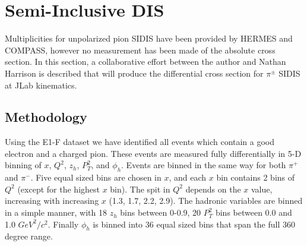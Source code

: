 \section{Semi-Inclusive DIS}

% 
%






Multiplicities for unpolarized pion SIDIS have been provided by HERMES and COMPASS, however no measurement has been made of the absolute cross section.  In this section, a collaborative effort between the author and Nathan Harrison is described that will produce the differential cross section for $\pi^{\pm}$ SIDIS at JLab kinematics.  

\subsection{Methodology}
Using the E1-F dataset we have identified all events which contain a good electron and a charged pion.  These events are measured fully differentially in 5-D binning of $x$, $Q^2$, $z_h$, $P_{T}^{2}$, and $\phi_h$.  Events are binned in the same way for both $\pi^+$ and $\pi^-$.  Five equal sized bins are chosen in $x$, and each $x$ bin contains 2 bins of $Q^2$ (except for the highest $x$ bin).  The spit in $Q^2$ depends on the $x$ value, increasing with increasing $x$ (1.3, 1.7, 2.2, 2.9).  The hadronic variables are binned in a simple manner, with 18 $z_h$ bins between 0-0.9, 20 $P_{T}^{2}$ bins between 0.0 and 1.0 $GeV^2/c^2$.  Finally $\phi_h$ is binned into 36 equal sized bins that span the full 360 degree range. \\

